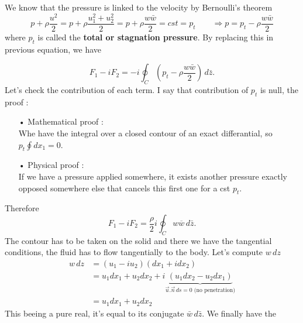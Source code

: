 	We know that the pressure is linked to the velocity by Bernoulli's theorem 
	\begin{equation}
	p + \rho \frac{u^2}{2} = p +\rho \frac{u_1^2+u_2^2}{2} = p +\rho \frac{w	\bar{w}}{2} = cst = p_t \qquad \Rightarrow p = p_t - \rho \frac{w	\bar{w}}{2}
	\end{equation}
	where $p_t$ is called the \textbf{total or stagnation pressure}. By replacing this in previous equation, we have
	
	\begin{equation}
		F_1 - i F_2 = -i \oint_C \left(p_t - \rho\frac{w \bar{w}}{2}\right) \, d\bar{z}.
	\end{equation}
	Let's check the contribution of each term. I say that contribution of $p_t$ is null, the proof :
	\begin{itemize}
		\item[•] Mathematical proof : \\
		Whe have the integral over a closed contour of an exact differantial, so $p_t\oint dx_1 = 0$.
		\item[•] Physical proof : \\
		If we have a pressure applied somewhere, it exists another pressure exactly opposed somewhere else that cancels this first one for a cst $p_t$. \\
	\end{itemize}
	
	Therefore 
	\begin{equation}
	F_1 - i F_2 = \frac{\rho}{2}i \oint_C  w \overline{w} \, d\bar{z}.
	\end{equation}
	The contour has to be taken on the solid and there we have the tangential conditions, the fluid has to flow tangentially to the body. Let's compute $w\, dz$
	\begin{equation}
	\begin{aligned}
	w \, dz &= (u_1 - i u_2) (dx_1 + i dx_2) \\
 				&= u_1 dx_1 + u_2 dx_2 + i \underbrace{(u_1 dx_2 - u_2 dx_1)}_{\vec{u}.	\vec{n} \, ds = 0 \mbox{ (no penetration)}}\\
				&= u_1 dx_1 + u_2 dx_2
	\end{aligned}
\end{equation}
	This beeing a pure real, it's equal to its conjugate $\bar{w}\, d\bar{z}$. We finally have the 
	
